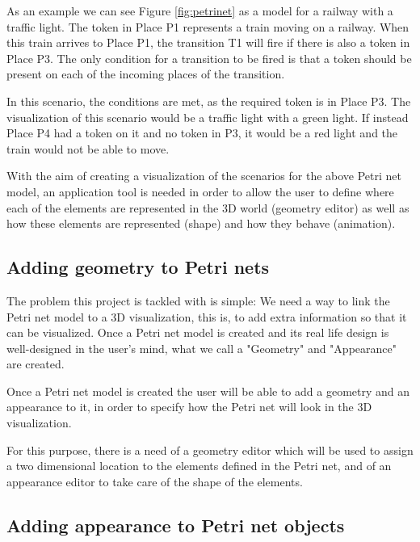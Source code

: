As an example we can see Figure \ref{fig:petrinet} as a model for a railway with a traffic light. The token in Place P1 represents a train moving on a railway. When this train arrives to Place P1, the transition T1 will fire if there is also a token in Place P3. The only condition for a transition to be fired is that a token should be present on each of the incoming places of the transition.

In this scenario, the conditions are met, as the required token is in Place P3. The visualization of this scenario would be a traffic light with a green light. If instead Place P4 had a token on it and no token in P3, it would be a red light and the train would not be able to move. 


With the aim of creating a visualization of the scenarios for the above Petri net model, an application tool is needed in order to allow the user to define where each of the elements are represented in the 3D world (geometry editor) as well as how these elements are represented (shape) and how they behave (animation). 

\subsection{Adding geometry to Petri nets}
The problem this project is tackled with is simple: We need a way to link the Petri net model to a 3D visualization, this is, to add extra information so that it can be visualized. Once a Petri net model is created and its real life design is well-designed in the user's mind, what we call a "Geometry" and "Appearance" are created. 

Once a Petri net model is created the user will be able to add a geometry and an appearance to it, in order to specify how the Petri net will look in the 3D visualization.

For this purpose, there is a need of a geometry editor which will be used to assign a two dimensional location to the elements defined in the Petri net, and of an appearance editor to take care of the shape of the elements.

\subsection{Adding appearance to Petri net objects}
\label{sec:appearance}


